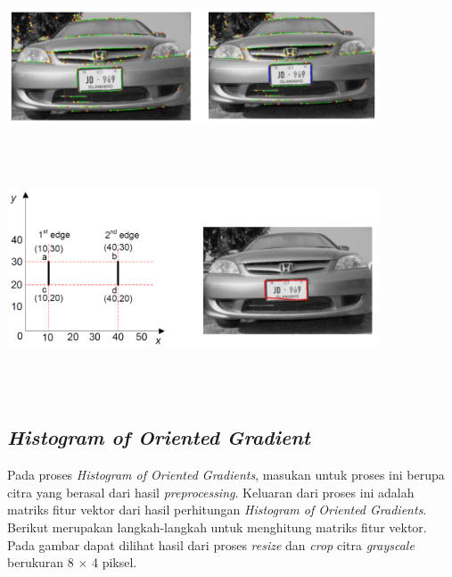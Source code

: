 \begin{enumerate}
\begin{adjustbox}{width=1\textwidth}
	\noindent\begin{minipage}{\linewidth}
		\centering\includegraphics[width=11cm]{images/SeleksiKandidatGaris.PNG}
		\label{fig:SeleksiKandidatGaris}
	\end{minipage}
\end{adjustbox}\\
\\
\begin{adjustbox}{width=1\textwidth}
	\noindent\begin{minipage}{\linewidth}
		\centering\includegraphics[width=11cm]{images/AreaPlatKendaraan.PNG}
		\label{fig:Penentuan Area Plat Kendaraan}
	\end{minipage}
\end{adjustbox}\\
\\
\end{enumerate}

\subsection{\textit{Histogram of Oriented Gradient}}
\noindent Pada proses \textit{Histogram of Oriented Gradients}, masukan untuk proses ini berupa citra yang berasal dari hasil \textit{preprocessing}. Keluaran dari proses ini adalah matriks fitur vektor dari hasil perhitungan \textit{Histogram of Oriented Gradients}. Berikut merupakan langkah-langkah untuk menghitung matriks fitur vektor. Pada gambar dapat dilihat hasil dari proses \textit{resize} dan \textit{crop} citra \textit{grayscale} berukuran 8 $\times$ 4 piksel.

